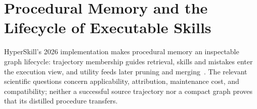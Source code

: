\chapter{Procedural Memory and the Lifecycle of Executable Skills}\label{ch:C15}

HyperSkill's 2026 implementation makes procedural memory an inspectable graph lifecycle: trajectory membership guides retrieval, skills and mistakes enter the execution view, and utility feeds later pruning and merging~\cite{xu2026hyperskill,repo_hyperskill2026}. The relevant scientific questions concern applicability, attribution, maintenance cost, and compatibility; neither a successful source trajectory nor a compact graph proves that its distilled procedure transfers.









